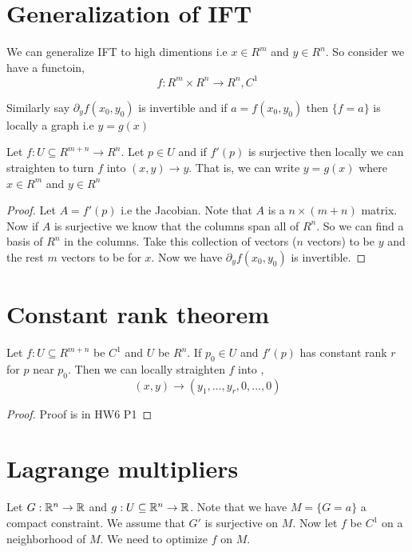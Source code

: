 \section{Generalization of IFT}
We can generalize IFT to high dimentions i.e $x \in R^{m}$ and $y \in R^{n}$. So consider we have a functoin, 
\[
    f: R^{m} \times R^{n} \to R^{n}, C^{1}
\]

Similarly say $\partial_y f(x_{0}, y_{0}) $ is invertible and if $a = f(x_{0},y_{0})$ then $\{f = a\}$ is locally a graph i.e $y = g(x)$

\vspace{1em}

Let $f: U \subseteq R^{m + n} \to R^{n}$. Let $p \in U$ and if $f'(p)$ is surjective then locally we can straighten to turn $f$ into $(x, y) \to y$. That is, we can write $y = g(x)$ where $x \in R^{m}$ and $y \in R^{n}$

\begin{proof}
    Let $A = f'(p)$ i.e the Jacobian. Note that $A$ is a $n \times (m + n)$ matrix. Now if $A$ is surjective we know that the columns span all of $R^{n}$. So we can find a basis of $R^{n}$ in the columns. Take this collection of vectors ($n$ vectors) to be $y$ and the rest $m$ vectors to be for $x$. Now we have $\partial_y f(x_{0}, y_{0})$ is invertible.
\end{proof}


\section{Constant rank theorem}
\begin{theorem}
    Let $f: U \subseteq R^{m + n}$ be $C^{1}$ and $U$ be  $R^{n}$. If $p_{0} \in U$ and $f'(p)$ has constant rank $r$ for $p$ near $p_{0}$. Then we can locally straighten $f$ into , 
    \[
        (x,y) \to (y_{1}, \dots, y_r, 0, \dots, 0)
    \]
\end{theorem}

\begin{proof}
  Proof is in HW6 P1
\end{proof}
 

\section{Lagrange multipliers}
Let $G: \mathbb{R}^{n} \to \mathbb{R}$ and $g: U \subseteq \mathbb{R}^{n} \to \mathbb{R}$. Note that we have $M = \{G = a\}$ a compact constraint. We assume that $G'$ is surjective on $M$. Now let $f$ be $C^{1}$ on a neighborhood of $M$. We need to optimize $f$ on $M$.



